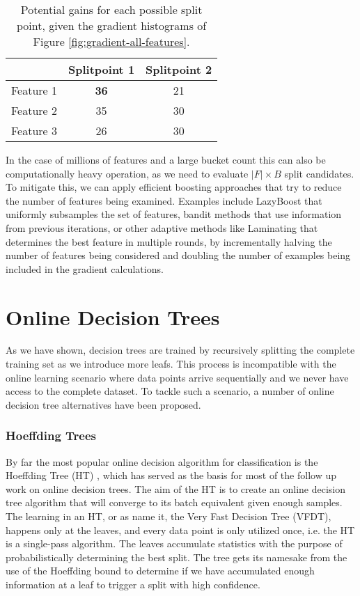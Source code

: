 \begin{table}
	\centering
	\begin{tabular}{ccc}
		\toprule
		& Splitpoint 1 & Splitpoint 2 \\
		\midrule
		Feature 1 & \textbf{36} & 21 \\
		Feature 2 & 35 & 30 \\
		Feature 3 & 26 & 30 \\
		\bottomrule
	\end{tabular}
	\caption{Potential gains for each possible split point, given
	the gradient histograms of Figure \ref{fig:gradient-all-features}.}
	\label{tab:gains}
\end{table}

In the case of millions of features and a large bucket count this can also be
computationally heavy operation, as we need to evaluate $|F| \times B$ split candidates.
To mitigate this, we can apply efficient boosting approaches that try
to reduce the number of features being examined. Examples include LazyBoost \cite{lazyboost}
that uniformly subsamples the set of features,
bandit methods \cite{bandits-boosting} that use information from previous iterations, or other adaptive
methods like Laminating \cite{laminating} that determines the best feature in multiple rounds, by incrementally
halving the number of features being considered and doubling the number of examples being
included in the gradient calculations.

\section{Online Decision Trees}
\label{sec:bg-dt-online-trees}

As we have shown, decision trees are trained by recursively splitting the complete
training set as we introduce more leafs. This process is incompatible with the online
learning scenario where data points arrive sequentially and we never have access to
the complete dataset. To tackle such a scenario, a number of online decision tree
alternatives have been proposed.

\subsubsection*{Hoeffding Trees}

By far the most popular online decision algorithm for classification is the Hoeffding Tree (HT) \cite{vfdt},
which has served as the basis for most of the follow up work on online decision
trees. The aim of the HT is to create an online decision tree algorithm that will converge
to its batch equivalent given enough samples.
The learning in an HT, or as \citet{vfdt} name it, the Very Fast Decision
Tree (VFDT), happens only at the leaves, and every data point is only utilized
once, i.e. the HT is a single-pass algorithm. The leaves accumulate statistics
with the purpose of probabilistically determining the best split. The tree gets its
namesake from the use of the Hoeffding bound to determine if we have accumulated
enough information at a leaf to trigger a split with high confidence.

